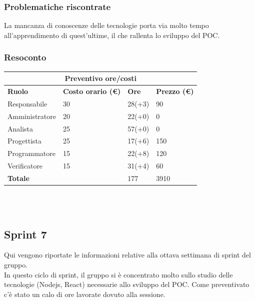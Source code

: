 \documentclass[10pt]{article}
\begin{document}
\subsubsection{Problematiche riscontrate}
La mancanza di conoscenze delle tecnologie porta via molto tempo all'apprendimento di quest'ultime, il che rallenta lo sviluppo del POC.
\subsubsection{Resoconto}
\begin{center}
	\begin{tabularx}{\textwidth}{|X|X|X|X|}
		\hline
		\multicolumn{4}{|c|}{\textbf{Preventivo ore/costi}}                                      \\
		\hline
		\hline
		\textbf{Ruolo}  & \textbf{Costo orario (\euro)} & \textbf{Ore} & \textbf{Prezzo (\euro)} \\
		\hline
		Responsabile    & 30                            & 28(+3)       & 90                      \\
		\hline
		Amministratore  & 20                            & 22(+0)       & 0                       \\
		\hline
		Analista        & 25                            & 57(+0)       & 0                       \\
		\hline
		Progettista     & 25                            & 17(+6)       & 150                     \\
		\hline
		Programmatore   & 15                            & 22(+8)       & 120                     \\
		\hline
		Verificatore    & 15                            & 31(+4)       & 60                      \\
		\hline
		\hline
		\textbf{Totale} &                               & 177          & 3910                    \\
		\hline
	\end{tabularx}\\[8pt]
	\mbox{}\\
\end{center}

\subsection{Sprint 7}
Qui vengono riportate le informazioni relative alla ottava settimana di sprint del gruppo. \\
In questo ciclo di sprint, il gruppo si è concentrato molto sullo studio delle tecnologie (Nodejs, React) necessarie allo sviluppo del POC. Come preventivato c'è stato un calo di ore lavorate dovuto alla sessione.\\
\end{document}
